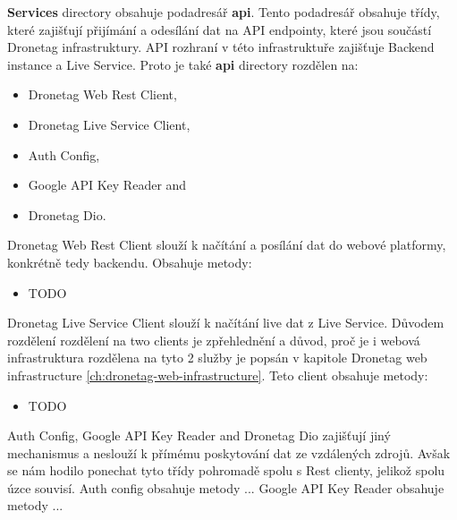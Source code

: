 \textbf{Services} directory obsahuje podadresář \textbf{api}.
Tento podadresář obsahuje třídy, které zajišťují přijímání a odesílání dat na API endpointy, které jsou součástí Dronetag infrastruktury.
API rozhraní v této infrastruktuře zajišťuje Backend instance a Live Service.
Proto je také \textbf{api} directory rozdělen na:
\begin{itemize}
    \item Dronetag Web Rest Client,
    \item Dronetag Live Service Client,
    \item Auth Config,
    \item Google API Key Reader and
    \item Dronetag Dio.
\end{itemize}
Dronetag Web Rest Client slouží k načítání a posílání dat do webové platformy, konkrétně tedy backendu.
Obsahuje metody:
\begin{itemize}
    \item TODO
\end{itemize}

Dronetag Live Service Client slouží k načítání live dat z Live Service.
Důvodem rozdělení rozdělení na two clients je zpřehlednění a důvod, proč je i webová infrastruktura rozdělena na tyto 2 služby je popsán v kapitole Dronetag web infrastructure \ref{ch:dronetag-web-infrastructure}.
Teto client obsahuje metody:
\begin{itemize}
    \item TODO
\end{itemize}

Auth Config, Google API Key Reader and Dronetag Dio zajišťují jiný mechanismus a neslouží k přímému poskytování dat ze vzdálených zdrojů.
Avšak se nám hodilo ponechat tyto třídy pohromadě spolu s Rest clienty, jelikož spolu úzce souvisí.
Auth config obsahuje metody ...
Google API Key Reader obsahuje metody ...